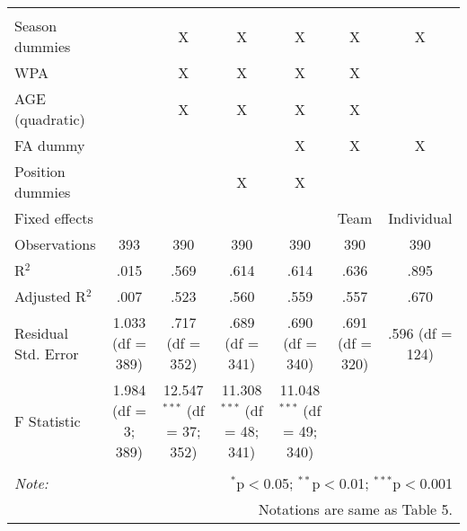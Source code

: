 \begin{table}[H]
\begin{tabular}{@{\extracolsep{5pt}}lcccccc}
  & & & & & & \\
\hline \\[-1.8ex]
Season dummies &  & X & X & X & X & X \\
WPA &  & X & X & X & X &  \\
AGE (quadratic) &  & X & X & X & X &  \\
FA dummy &  &  &  & X & X & X \\
Position dummies &  &  & X & X &  &  \\
Fixed effects &  &  &  &  & Team & Individual \\
Observations & 393 & 390 & 390 & 390 & 390 & 390 \\
R$^{2}$ & .015 & .569 & .614 & .614 & .636 & .895 \\
Adjusted R$^{2}$ & .007 & .523 & .560 & .559 & .557 & .670 \\
Residual Std. Error & 1.033 (df = 389) & .717 (df = 352) & .689 (df = 341) & .690 (df = 340) & .691 (df = 320) & .596 (df = 124) \\
F Statistic & 1.984 (df = 3; 389) & 12.547$^{***}$ (df = 37; 352) & 11.308$^{***}$ (df = 48; 341) & 11.048$^{***}$ (df = 49; 340) &  &  \\
\hline
\hline \\[-1.8ex]
\textit{Note:}  & \multicolumn{6}{r}{$^{*}$p$<$0.05; $^{**}$p$<$0.01; $^{***}$p$<$0.001} \\
& \multicolumn{6}{r}{Notations are same as Table 5.} \\
\end{tabular}
\end{table}

